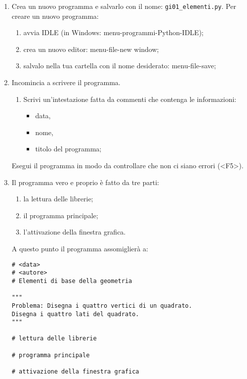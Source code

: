 \begin{enumerate} [noitemsep]
\item Crea un nuovo programma e salvarlo con il nome: 
\texttt{gi01\_elementi.py}.
Per creare un nuovo programma:

\begin{enumerate} [noitemsep]
\item avvia IDLE (in Windows: menu-programmi-Python-IDLE);
\item crea un nuovo editor: menu-file-new window;
\item salvalo nella tua cartella con il nome desiderato: menu-file-save;
\end{enumerate}

\item Incomincia a scrivere il programma.
\begin{enumerate} [noitemsep]
\item Scrivi un'intestazione fatta da commenti che contenga le informazioni:

\begin{itemize} [noitemsep]
\item data,
\item nome,
\item titolo del programma;
\end{itemize}
\end{enumerate}

Esegui il programma in modo da controllare che non ci siano errori 
(\textless{}F5\textgreater{}).
\item Il programma vero e proprio è fatto da tre parti:

\begin{enumerate} [noitemsep]
\item la lettura delle librerie;
\item il programma principale;
\item l'attivazione della finestra grafica.
\end{enumerate}

A questo punto il programma assomiglierà a:

\begin{lstlisting}
# <data>
# <autore>
# Elementi di base della geometria

"""
Problema: Disegna i quattro vertici di un quadrato.
Disegna i quattro lati del quadrato.
"""

# lettura delle librerie

# programma principale

# attivazione della finestra grafica
\end{lstlisting}


\end{enumerate}
